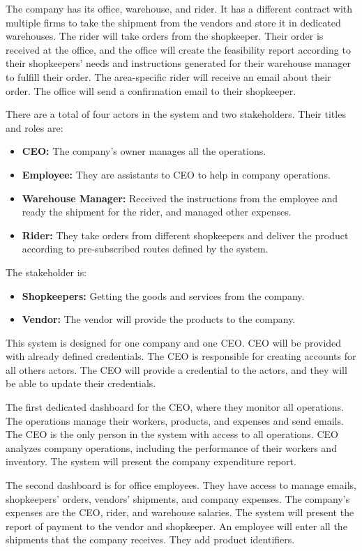 \documentclass[12pt,a4paper]{article}
\begin{document}
The company has its office, warehouse, and rider. 
It has a different contract with multiple firms to take the shipment from the vendors and store it in dedicated warehouses. The rider will take orders from the shopkeeper. Their order is received at the office, and the office will create the feasibility report according to their shopkeepers' needs and instructions generated for their warehouse manager to fulfill their order. The area-specific rider will receive an email about their order. The office will send a confirmation email to their shopkeeper. 
 
There are a total of four actors in the system and two stakeholders. Their titles and roles are:
\begin{itemize}
\item \textbf{ CEO:} The company's owner manages all the operations.
\item \textbf{Employee:} They are assistants to CEO to help in company operations. 
\item \textbf{Warehouse Manager:} Received the instructions from the employee and ready the shipment for the rider, and managed other expenses.
\item \textbf{Rider:} They take orders from different shopkeepers and deliver the product according to pre-subscribed routes defined by the system.
\end{itemize}
The stakeholder is:
\begin{itemize}
\item \textbf{Shopkeepers:} Getting the goods and services from the company.
\item \textbf{Vendor:} The vendor will provide the products to the company. 
\end{itemize}
This system is designed for one company and one CEO. CEO will be provided with already defined credentials. The CEO is responsible for creating accounts for all others actors. The CEO will provide a credential to the actors, and they will be able to update their credentials. 
 
The first dedicated dashboard for the CEO, where they monitor all operations. The operations manage their workers, products, and expenses and send emails. The CEO is the only person in the system with access to all operations. CEO analyzes company operations, including the performance of their workers and inventory. The system will present the company expenditure report.
 
The second dashboard is for office employees. They have access to manage emails, shopkeepers' orders, vendors' shipments, and company expenses. The company's expenses are the CEO, rider, and warehouse salaries. The system will present the report of payment to the vendor and shopkeeper. An employee will enter all the shipments that the company receives. They add product identifiers.
 
\end{document}

